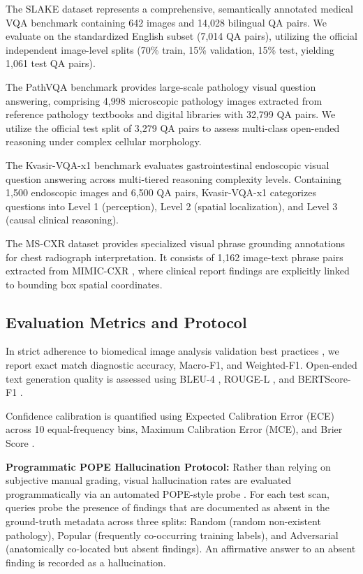 \documentclass[journal,twoside,web]{ieeecolor}
\begin{document}
The SLAKE dataset \cite{liu2021} represents a comprehensive, semantically annotated medical VQA benchmark containing 642 images and 14,028 bilingual QA pairs. We evaluate on the standardized English subset (7,014 QA pairs), utilizing the official independent image-level splits (70\% train, 15\% validation, 15\% test, yielding 1,061 test QA pairs).

The PathVQA benchmark \cite{he2020pathvqa} provides large-scale pathology visual question answering, comprising 4,998 microscopic pathology images extracted from reference pathology textbooks and digital libraries with 32,799 QA pairs. We utilize the official test split of 3,279 QA pairs to assess multi-class open-ended reasoning under complex cellular morphology.

The Kvasir-VQA-x1 benchmark \cite{jha2023} evaluates gastrointestinal endoscopic visual question answering across multi-tiered reasoning complexity levels. Containing 1,500 endoscopic images and 6,500 QA pairs, Kvasir-VQA-x1 categorizes questions into Level 1 (perception), Level 2 (spatial localization), and Level 3 (causal clinical reasoning).

The MS-CXR dataset \cite{boecking2022} provides specialized visual phrase grounding annotations for chest radiograph interpretation. It consists of 1,162 image-text phrase pairs extracted from MIMIC-CXR \cite{johnson2019mimic}, where clinical report findings are explicitly linked to bounding box spatial coordinates.

\subsection{Evaluation Metrics and Protocol}
In strict adherence to biomedical image analysis validation best practices \cite[Sec.~3, p.~198]{maier2024}, we report exact match diagnostic accuracy, Macro-F1, and Weighted-F1. Open-ended text generation quality is assessed using BLEU-4 \cite{papineni2002bleu}, ROUGE-L \cite{lin2004rouge}, and BERTScore-F1 \cite{zhang2019bertscore}.

Confidence calibration is quantified using Expected Calibration Error (ECE) \cite{guo2017} across 10 equal-frequency bins, Maximum Calibration Error (MCE), and Brier Score \cite{brier1950}. 

\noindent\textbf{Programmatic POPE Hallucination Protocol:} Rather than relying on subjective manual grading, visual hallucination rates are evaluated programmatically via an automated POPE-style probe \cite{li2023pope}. For each test scan, queries probe the presence of findings that are documented as absent in the ground-truth metadata across three splits: Random (random non-existent pathology), Popular (frequently co-occurring training labels), and Adversarial (anatomically co-located but absent findings). An affirmative answer to an absent finding is recorded as a hallucination.
\end{document}
